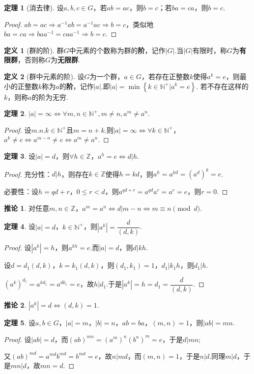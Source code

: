 \documentclass[12pt]{ctexart}
\theoremstyle{definition}
\newtheorem{definition}{定义}[section]
\newtheorem{theorem}{定理}[section]
\newtheorem{corollary}{推论}[section]
\theoremstyle{plain}
\begin{document}
\begin{theorem}[消去律]
	设$a,b,c\in G$，若$ab=ac$，则$b=c$；若$ba=ca$，则$b=c$.
\end{theorem}
\begin{proof}
	$ab=ac\Rightarrow a^{-1}ab=a^{-1}ac\Rightarrow b=c$，类似地$ba=ca\Rightarrow baa^{-1}=caa^{-1}\Rightarrow b=c$.
\end{proof}
\begin{definition}[群的阶]
	群$G$中元素的个数称为群的\textbf{阶}，记作$|G|$.当$|G|$有限时，称$G$为\textbf{有限群}，否则称$G$为\textbf{无限群}.
\end{definition}
\begin{definition}[群中元素的阶]
	设$G$为一个群，$a\in G$，若存在正整数$k$使得$a^k=e$，则最小的正整数$k$称为$a$的\textbf{阶}，记作$|a|$.即$|a|=\min\left\{k\in \mathbb{N}^+|a^k=e\right\}$. 若不存在这样的$k$，则称$a$的阶为无穷.
\end{definition}
\begin{theorem}
	$|a|=\infty\iff \forall m, n\in \mathbb{N}^+,m\neq n,a^m\neq a^n$.
\end{theorem}
\begin{proof}
	设$m.n.k\in\mathbb{N}^+$且$m=n+k$.则$|a|=\infty\iff \forall k\in\mathbb{N}^+$，$a^k\neq e\iff a^{m-n}\neq e\iff a^m\neq a^n$.
\end{proof}
\begin{theorem}
	设$|a|=d$，则$\forall h\in\mathbb{Z}$，$a^h=e\iff d|h$.
\end{theorem}
\begin{proof}
	充分性：$d|h$，则存在$k\in\mathbb{Z}$使得$h=kd$，则$a^{h}=a^{kd}=(a^{d})^k=e$.
	
	必要性：设$h=qd+r$，$0 \leqslant r<d$，则$a^{qd+r}=a^{qd}a^{r}=a^r=e$，则$r=0$.
\end{proof}
\begin{corollary}
	对任意$m,n\in\mathbb{Z}$，$a^m=a^n\iff d|m-n\iff m\equiv n\pmod d$.
\end{corollary}
\begin{theorem}
	设$|a|=d$，$k\in\mathbb{N}^+$，则$|a^k|=\dfrac{d}{(d,k)}$.
\end{theorem}
\begin{proof}
	设$|a^k|=h$，则$a^{kh}=e$.而$|a|=d$，则$d|kh$.
	
	设$d=d_1(d,k)$，$k=k_1(d,k)$，则$(d_1,k_1)=1$，$d_1|k_1h$，则$d_1|h$.
	
	$(a^k)^{d_1}=a^{kd_1}=a^{dk_1}=e$，故$h|d_1$.于是$|a^k|=h=d_1=\dfrac{d}{(d,k)}$.
\end{proof}
\begin{corollary}
	$|a^k|=d\iff (d,k)=1$.
\end{corollary}
\begin{theorem}
	设$a,b\in G$，$|a|=m$，$|b|=n$，$ab=ba$，$(m,n)=1$，则$|ab|=mn$.
\end{theorem}
\begin{proof}
	设$|ab|=d$，而$(ab)^{mn}=(a^m)^n(b^n)^m=e$，于是$d|mn$;
	
	又$(ab)^{md}=a^{md}b^{md}=b^{md}=e$，故$n|md$，而$(m,n)=1$，于是$n|d$.同理$m|d$，于是$mn|d$，故$mn=d$.
\end{proof}
\end{document}
